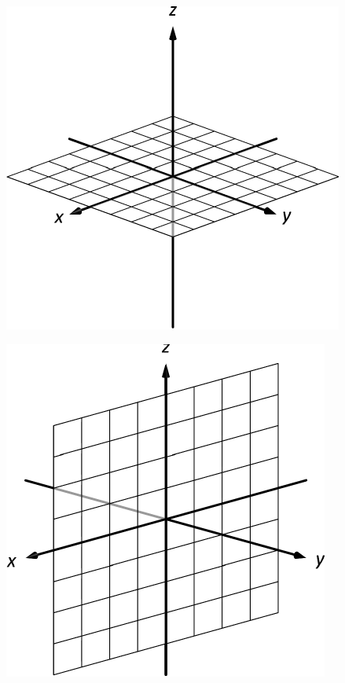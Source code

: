 \documentclass[10pt]{article}
\begin{document}
\includegraphics{figspacexy_3DBW.pdf}
\texttt{}

\includegraphics{figspacexz_3DBW.pdf}
\texttt{}
\end{document}
